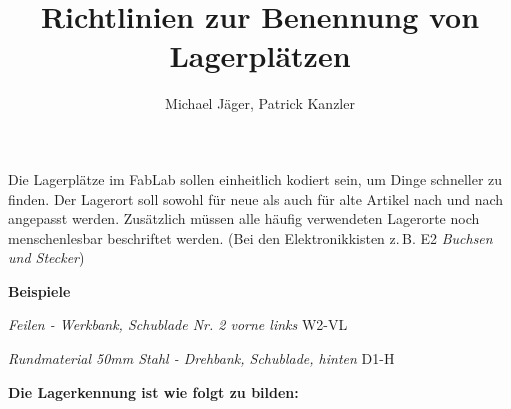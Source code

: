 \documentclass{\basedir/fablab-document}
\title{Richtlinien zur Benennung von Lagerplätzen}
\author{Michael Jäger, Patrick Kanzler}
\begin{document}
\vspace*{-7em}\maketitle

Die Lagerplätze im FabLab sollen einheitlich kodiert sein, um Dinge schneller zu finden.
Der Lagerort soll sowohl für neue als auch für alte Artikel nach und nach angepasst werden.
Zusätzlich müssen alle häufig verwendeten Lagerorte noch menschenlesbar beschriftet werden.
(Bei den Elektronikkisten z.\,B. E2 {\itshape Buchsen und Stecker})

\textbf{Beispiele}

\textit{Feilen - Werkbank, Schublade Nr. 2 vorne links}\newline
W2-VL

\textit{Rundmaterial 50mm Stahl - Drehbank, Schublade, hinten}\newline
D1-H

\textbf{Die Lagerkennung ist wie folgt zu bilden:}
\end{document}
